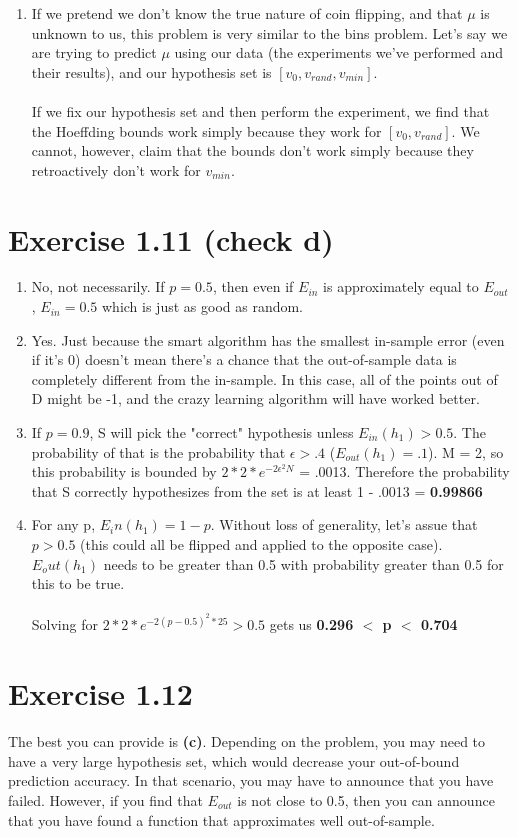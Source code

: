 \documentclass[12pt]{article}
\begin{document}
\begin{enumerate}[label=(\alph*)]
	\item If we pretend we don't know the true nature of coin flipping, and that $\mu$ is unknown to us, this problem is very similar to the bins problem. Let's say we are trying to predict $\mu$ using our data (the experiments we've performed and their results), and our hypothesis set is $[v_0, v_{rand}, v_{min}]$.
	\\ \\ If we fix our hypothesis set and then perform the experiment, we find that the Hoeffding bounds work simply because they work for $[v_0, v_{rand}]$. We cannot, however, claim that the bounds don't work simply because they retroactively don't work for $v_{min}$.
\end{enumerate}

\section*{Exercise 1.11 (check d)}
\begin{enumerate}[label=(\alph*)]
	\item No, not necessarily. If $p = 0.5$, then even if $E_{in}$ is approximately equal to $E_{out}$, $E_{in} = 0.5$ which is just as good as random.
	\item Yes. Just because the smart algorithm has the smallest in-sample error (even if it's 0) doesn't mean there's a chance that the out-of-sample data is completely different from the in-sample. In this case, all of the points out of D might be -1, and the crazy learning algorithm will have worked better.
	\item If $p = 0.9$, S will pick the "correct" hypothesis unless $E_{in}(h_1) > 0.5$. The probability of that is the probability that $\epsilon > .4$ ($E_{out}(h_1) = .1$). M = 2, so this probability is bounded by $2 * 2 * e^{-2\epsilon^2N}$ = .0013. Therefore the probability that S correctly hypothesizes from the set is at least 1 - .0013 = \textbf{0.99866}
	\item For any p, $E_in(h_1) = 1 - p$. Without loss of generality, let's assue that $p > 0.5$ (this could all be flipped and applied to the opposite case). $E_out(h_1)$ needs to be greater than 0.5 with probability greater than 0.5 for this to be true.
	\\ \\ Solving for $2 * 2 * e^{-2(p - 0.5)^2*25} > 0.5$ gets us \textbf{0.296 $<$ p $<$ 0.704}
\end{enumerate}

\section*{Exercise 1.12}
The best you can provide is \textbf{(c)}. Depending on the problem, you may need to have a very large hypothesis set, which would decrease your out-of-bound prediction accuracy. In that scenario, you may have to announce that you have failed. However, if you find that $E_{out}$ is not close to 0.5, then you can announce that you have found a function that approximates well out-of-sample.
\end{document}
